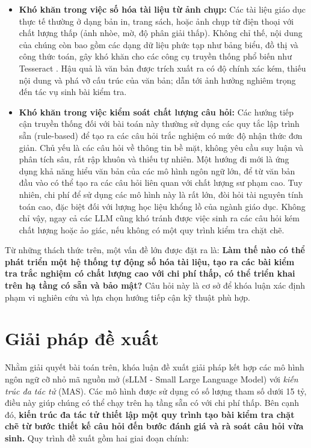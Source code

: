 \begin{itemize}
    \item \textbf{Khó khăn trong việc số hóa tài liệu từ ảnh chụp:} Các tài liệu giáo dục thực tế thường ở dạng bản in, trang sách, hoặc ảnh chụp từ điện thoại với chất lượng thấp (ảnh nhòe, mờ, độ phân giải thấp). Không chỉ thế, nội dung của chúng còn bao gồm các dạng dữ liệu phức tạp như bảng biểu, đồ thị và công thức toán, gây khó khăn cho các công cụ truyền thống phổ biến như Tesseract \cite{smith2007overview}. Hậu quả là văn bản được trích xuất ra có độ chính xác kém, thiếu nội dung và phá vỡ cấu trúc của văn bản; dẫn tới ảnh hưởng nghiêm trọng đến tác vụ sinh bài kiểm tra.

    \item \textbf{Khó khăn trong việc kiểm soát chất lượng câu hỏi:} Các hướng tiếp cận truyền thống đối với bài toán này thường sử dụng các quy tắc lập trình sẵn (rule-based) \cite{heilman2010good} để tạo ra các câu hỏi trắc nghiệm có mức độ nhận thức đơn giản. Chủ yếu là các câu hỏi về thông tin bề mặt, không yêu cầu suy luận và phân tích sâu, rất rập khuôn và thiếu tự nhiên. Một hướng đi mới là ứng dụng khả năng hiểu văn bản của các mô hình ngôn ngữ lớn, để từ văn bản đầu vào có thể tạo ra các câu hỏi liên quan với chất lượng sư phạm cao. Tuy nhiên, chi phí để sử dụng các mô hình này là rất lớn, đòi hỏi tài nguyên tính toán cao, đặc biệt đối với lượng học liệu khổng lồ của ngành giáo dục. Không chỉ vậy, ngay cả các LLM cũng khó tránh được việc sinh ra các câu hỏi kém chất lượng hoặc ảo giác, nếu không có một quy trình kiểm tra chặt chẽ.
\end{itemize}

Từ những thách thức trên, một vấn đề lớn được đặt ra là: \textbf{Làm thế nào có thể phát triển một hệ thống tự động số hóa tài liệu, tạo ra các bài kiểm tra trắc nghiệm có chất lượng cao với chi phí thấp, có thể triển khai trên hạ tầng có sẵn và bảo mật?} Câu hỏi này là cơ sở để khóa luận xác định phạm vi nghiên cứu và lựa chọn hướng tiếp cận kỹ thuật phù hợp.

\section{Giải pháp đề xuất}

Nhằm giải quyết bài toán trên, khóa luận đề xuất giải pháp kết hợp các mô hình ngôn ngữ cỡ nhỏ mã nguồn mở (sLLM - Small Large Language Model) với \textit{kiến trúc đa tác tử} (MAS). Các mô hình được sử dụng có số lượng tham số dưới 15 tỷ, điều này giúp chúng có thể chạy trên hạ tầng sẵn có với chi phí thấp. Bên cạnh đó, \textbf{kiến trúc đa tác tử thiết lập một quy trình tạo bài kiểm tra chặt chẽ từ bước thiết kế câu hỏi đến bước đánh giá và rà soát câu hỏi vừa sinh.} Quy trình đề xuất gồm hai giai đoạn chính:

